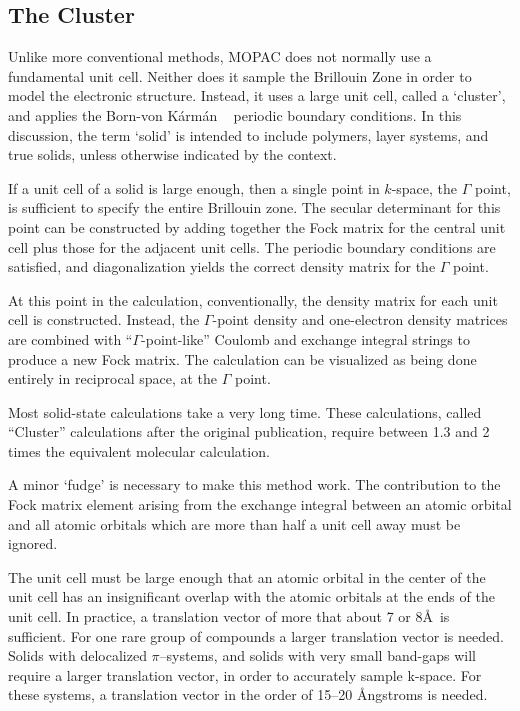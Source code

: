 \subsection{The Cluster}
Unlike more conventional methods, MOPAC does not normally use a fundamental
unit cell.  Neither does it sample the Brillouin Zone in order to model the
electronic structure.  Instead, it uses a large unit cell, called a `cluster',
  and applies the Born-von K\'{a}rm\'{a}n
~\cite{bornvon1,bornvon2} periodic  boundary conditions.  In this discussion,
the term `solid' is intended to include polymers, layer systems, and true
solids, unless otherwise indicated by the context.

If a unit cell of a solid is large enough,  then  a  single  point  in
 $k$-space,  the $\Gamma$ point,
is sufficient to specify the entire Brillouin zone.  The secular determinant
for this  point  can  be  constructed  by adding together the Fock matrix for
the central unit cell plus those for the adjacent unit cells.  The periodic
boundary conditions are satisfied, and diagonalization yields the correct
density matrix for the $\Gamma$ point.

At this point  in  the  calculation,  conventionally,  the  density matrix
for  each  unit  cell  is constructed.  Instead, the $\Gamma$-point density
and  one-electron  density  matrices  are   combined   with   ``$\Gamma$-point-like'' Coulomb  and  exchange integral strings to
produce a new Fock matrix.  The  calculation  can  be  visualized  as  being
done entirely in reciprocal space, at the $\Gamma$ point.

Most  solid-state  calculations  take  a  very  long  time.   These
calculations,   called ``Cluster'' calculations   after  the  original
publication, require between 1.3 and 2 times  the  equivalent  molecular
calculation.

A minor `fudge'  is  necessary  to  make  this  method  work.   The
contribution  to  the  Fock  matrix  element  arising  from the exchange
integral between an atomic orbital and all atomic orbitals which are more than
half a unit cell away must be ignored.

The unit cell must be large enough that an atomic  orbital  in  the
 center  of  the  unit  cell has an
insignificant overlap with the atomic orbitals at the ends of the  unit
cell.   In  practice,  a  translation vector  of more that about 7 or 8\AA\ is
sufficient.  For one rare group of compounds a larger translation vector is
needed.  Solids with delocalized  $\pi$--systems,  and  solids  with  very
small band-gaps will require a larger translation  vector,  in  order  to
accurately  sample k-space.   For these systems, a translation vector in the
order of  15--20 \AA ngstroms is needed.


